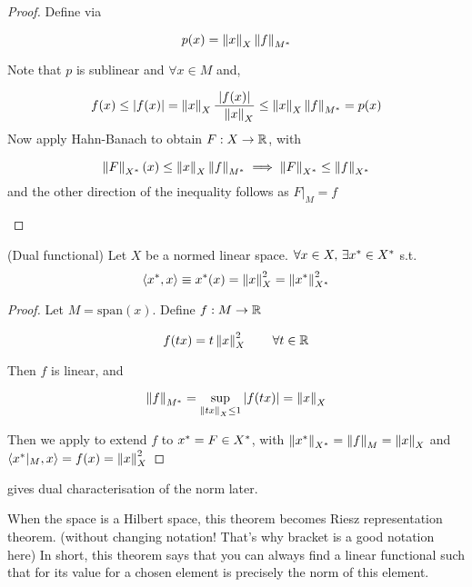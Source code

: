 \documentclass{article}
\begin{document}
\begin{proof}
Define  via  

$$p(x) = \left\|{x}\right\|_X \left\|{f}\right\|_{M^*}$$  

Note that $p$ is sublinear and $\forall x \in M$ and,  

$$f(x) \leq |f(x)|=\left\|{x}\right\|_X \frac{|f(x)|}{\hphantom{x} \left\|{x}\right\|_X} \leq \left\|{x}\right\|_X \left\|{f}\right\|_{M^*}=p(x)$$  
Now apply Hahn-Banach to obtain $F: X \to \mathbb{R}$, with  
\begin{unexaminable}
$$\left\|{F}\right\|_{X^*}(x) \leq \left\|{x}\right\|_X \left\|{f}\right\|_{M^*} \implies \left\|{F}\right\|_{X^*} \leq \left\|{f}\right\|_{X^*}$$
and the other direction of the inequality follows as $F |_M = f$
\end{unexaminable}
\end{proof}  

\begin{theorem}
(Dual functional)
\label{dual charaterization of norm}
	Let $X$ be a normed linear space. $\forall x\in X,\,\exists x^*\in {X}^*$ s.t. $$\left<{{x}^*},{x}\right>\equiv{x}^*(x)=\left\|{x}\right\|^2_X=\left\|{{x}^*}\right\|^2_{{X}^*}$$
\end{theorem}

\begin{proof}
	Let $M=\text{span}(x)$. Define $f: M \to \mathbb{R}$
	
	$$f(tx)=t\left\|{x}\right\|^2_X \qquad \forall t\in \mathbb{R}$$
	
	Then $f$ is linear, and 
	
	$$\left\|{f}\right\|_{{M}^*} = \sup_{\left\|{tx}\right\|_X \leq 1} |f(tx)| = \left\|{x}\right\|_X$$
	
	Then we apply  to extend $f$ to ${x}^*=F\in {X}^*$, with $\left\|{{x}^*}\right\|_{{X}^*}=\left\|{f}\right\|_M=\left\|{x}\right\|_X$ and $\left<{{x}^*|_{M}},{x}\right>=f(x)=\left\|{x}\right\|_X^2$
\end{proof}

\begin{remark}
     gives dual characterisation of the norm later.  
    \begin{unexaminable}
        When the space is a Hilbert space, this theorem becomes Riesz representation theorem. (without changing notation! That's why bracket is a good notation here) In short, this theorem says that you can always find a linear functional such that for its value for a chosen element is precisely the norm of this element.
    \end{unexaminable}
\end{remark}  
\end{document}
